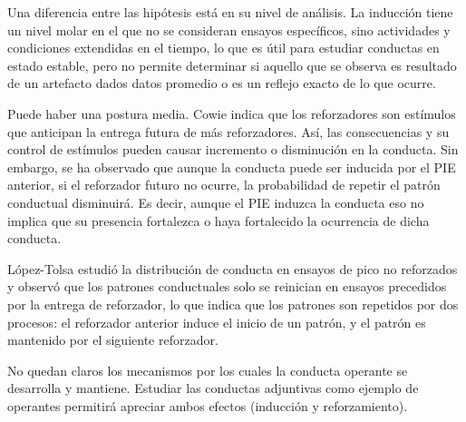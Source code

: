 \documentclass[a4paper,12pt]{article}
\begin{document}
Una diferencia entre las hipótesis está en su nivel de análisis. La inducción tiene un nivel molar en el que no se consideran ensayos específicos, sino actividades y condiciones extendidas en el tiempo, lo que es útil para estudiar conductas en estado estable, pero no permite determinar si aquello que se observa es resultado de un artefacto dados datos promedio o es un reflejo exacto de lo que ocurre.

Puede haber una postura media. Cowie indica que los reforzadores son estímulos que anticipan la entrega futura de más reforzadores. Así, las consecuencias y su control de estímulos pueden causar incremento o disminución en la conducta. Sin embargo, se ha observado que aunque la conducta puede ser inducida por el PIE anterior, si el reforzador futuro no ocurre, la probabilidad de repetir el patrón conductual disminuirá. Es decir, aunque el PIE induzca la conducta eso no implica que su presencia fortalezca o haya fortalecido la ocurrencia de dicha conducta.

López-Tolsa estudió la distribución de conducta en ensayos de pico no reforzados y observó que los patrones conductuales solo se reinician en ensayos precedidos por la entrega de reforzador, lo que indica que los patrones son repetidos por dos procesos: el reforzador anterior induce el inicio de un patrón, y el patrón es mantenido por el siguiente reforzador.

No quedan claros los mecanismos por los cuales la conducta operante se desarrolla y mantiene. Estudiar las conductas adjuntivas como ejemplo de operantes permitirá apreciar ambos efectos (inducción y reforzamiento). 
\end{document}
